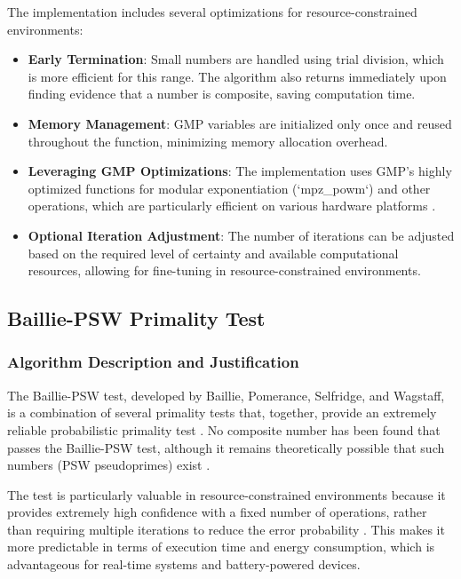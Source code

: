 The implementation includes several optimizations for resource-constrained environments:

\begin{itemize}
    \item \textbf{Early Termination}: Small numbers are handled using trial division, which is more efficient for this range. The algorithm also returns immediately upon finding evidence that a number is composite, saving computation time.
    
    \item \textbf{Memory Management}: GMP variables are initialized only once and reused throughout the function, minimizing memory allocation overhead.
    
    \item \textbf{Leveraging GMP Optimizations}: The implementation uses GMP's highly optimized functions for modular exponentiation (`mpz_powm`) and other operations, which are particularly efficient on various hardware platforms \cite{granlund2012}.
    
    \item \textbf{Optional Iteration Adjustment}: The number of iterations can be adjusted based on the required level of certainty and available computational resources, allowing for fine-tuning in resource-constrained environments.
\end{itemize}

\subsection{Baillie-PSW Primality Test}

\subsubsection{Algorithm Description and Justification}

The Baillie-PSW test, developed by Baillie, Pomerance, Selfridge, and Wagstaff, is a combination of several primality tests that, together, provide an extremely reliable probabilistic primality test \cite{baillie1980}. No composite number has been found that passes the Baillie-PSW test, although it remains theoretically possible that such numbers (PSW pseudoprimes) exist \cite{pomerance1984}.

The test is particularly valuable in resource-constrained environments because it provides extremely high confidence with a fixed number of operations, rather than requiring multiple iterations to reduce the error probability \cite{hardware_baillie}. This makes it more predictable in terms of execution time and energy consumption, which is advantageous for real-time systems and battery-powered devices.


